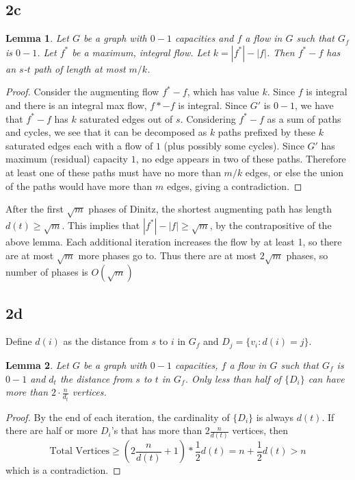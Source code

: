 \documentclass{article}
\newtheorem{lemma}{Lemma}
\begin{document}
\subsection*{2c}

\begin{lemma} Let $G$ be a graph with $0-1$ capacities and $f$ a flow in $G$
such that $G_f$ is $0-1$. Let $f^*$ be a maximum, integral flow. Let $k=|f^*| -
|f|$.  Then $f^*-f$ has an $s$-$t$ path of length at most
$m/k$. \end{lemma}
\begin{proof}
Consider the augmenting flow $f^* - f$, which has value $k$. Since $f$ is
integral and there is an integral max flow, $f*-f$ is integral. Since $G'$ is
$0-1$, we have that $f^* - f$ has $k$ saturated edges out of $s$. Considering
$f^* - f$ as a sum of paths and cycles, we see that it can be decomposed
as $k$ paths prefixed by these $k$ saturated edges each with a flow of $1$
(plus possibly some cycles). Since $G'$
has maximum (residual) capacity $1$, no edge appears in two of these paths.
Therefore at least one of these paths must have no more than $m/k$ edges, or
else the union of the paths would have more than $m$ edges, giving a
contradiction.
\end{proof}

After the first $\sqrt{m}$ phases of Dinitz, the shortest augmenting path has length
$d(t) \geq \sqrt{m}$. This implies that $|f^*| - |f| \geq \sqrt{m}$, by the
contrapositive of the above lemma. Each
additional iteration increases the flow by at least 1, so there are at most
$\sqrt{m}$ more phases go to. Thus there are at most $2\sqrt{m}$ phases,
so number of phases is $O(\sqrt{m})$

\subsection*{2d}

Define $d(i)$ as the distance from $s$ to $i$ in $G_f$ and $D_j = \{v_i: d(i) = j \}$. 
\begin{lemma} Let $G$ be a graph with $0-1$ capacities, $f$ a flow in $G$ such that 
$G_f$ is $0-1$ and $d_t$ the distance from $s$ to $t$ in $G_f$. Only less than half 
of $\{D_i\}$ can have more than $2\cdot \frac{n}{d_t}$ vertices.\end{lemma}
\begin{proof}
By the end of each iteration, the cardinality of $\{D_i\}$ is always $d(t)$. 
If there are half or more $D_i$'s that has more than $2\frac{n}{d(t)}$ vertices, 
then $$\text{Total Vertices} \geq (2\frac{n}{d(t)} + 1) * \frac{1}{2} d(t) 
= n + \frac{1}{2} d(t) > n$$ which is a contradiction. 
\end{proof}
\end{document}
